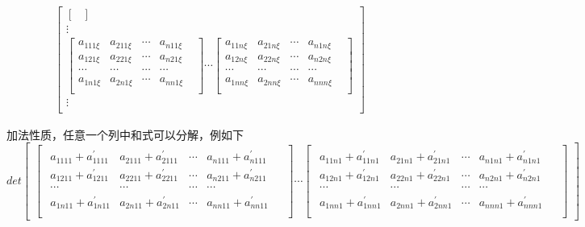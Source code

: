\documentclass[twoside,a4paper,CCT]{cctart}   %
\begin{document}
\begin{list}{}
\begin{align*}
\begin{bmatrix}
\begin{bmatrix}
  \end{bmatrix}\\
\vdots\\
 \begin{bmatrix}
   a_{111\xi}& a_{211\xi}&\cdots&a_{n11\xi}\\
   a_{121\xi}& a_{221\xi}&\cdots&a_{n21\xi}\\
  \cdots&\cdots&\cdots &\cdots& \\
a_{1n1\xi}& a_{2n1\xi}&\cdots&a_{nn1\xi}\\
\end{bmatrix}
\cdots
\begin{bmatrix}
  a_{11n\xi}& a_{21n\xi}&\cdots&a_{n1n\xi}\\
  a_{12n\xi}& a_{22n\xi}&\cdots&a_{n2n\xi}\\
  \cdots&\cdots&\cdots &\cdots& \\
  a_{1nn\xi}& a_{2nn\xi}&\cdots&a_{nnn\xi}\\
  \end{bmatrix}\\
\vdots\\
    \end{bmatrix}
\end{align*}
 \item
 加法性质，任意一个列中和式可以分解，例如下
 $$det\begin{bmatrix}
 \begin{bmatrix}\begin{smallmatrix}
 a_{1111} + a_{1111}^{'}& a_{2111} + a_{2111}^{'}&\cdots&a_{n111} + a_{n111}^{'}\\
 a_{1211} + a_{1211}^{'}& a_{2211} + a_{2211}^{'}&\cdots&a_{n211} + a_{n211}^{'}\\
  \cdots&\cdots&\cdots &\cdots& \\
a_{1n11} + a_{1n11}^{'}& a_{2n11} + a_{2n11}^{'}&\cdots&a_{nn11} + a_{nn11}^{'}\\
\end{smallmatrix}\end{bmatrix}
\cdots
\begin{bmatrix}\begin{smallmatrix}
  a_{11n1} + a_{11n1}^{'}& a_{21n1} + a_{21n1}^{'}&\cdots&a_{n1n1} + a_{n1n1}^{'}\\
a_{12n1} + a_{12n1}^{'}& a_{22n1} + a_{22n1}^{'}&\cdots&a_{n2n1} + a_{n2n1}^{'}\\
  \cdots&\cdots&\cdots &\cdots& \\
 a_{1nn1} + a_{1nn1}^{'}& a_{2nn1} + a_{2nn1}^{'}&\cdots&a_{nnn1} + a_{nnn1}^{'}\\

\end{smallmatrix}
\end{bmatrix}
\end{bmatrix}$$
\end{list}
\end{document}
